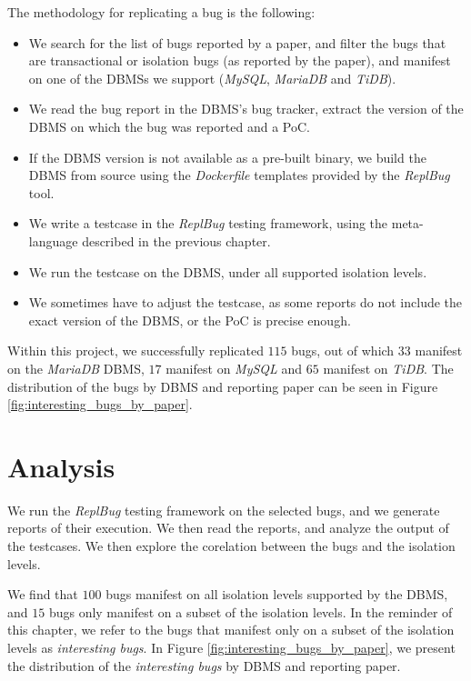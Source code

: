 The methodology for replicating a bug is the following:
\begin{itemize}
    \item We search for the list of bugs reported by a paper, and filter the bugs that are transactional or isolation bugs (as reported by the paper), and manifest on one of the DBMSs we support (\textit{MySQL}, \textit{MariaDB} and \textit{TiDB}).
    \item We read the bug report in the DBMS's bug tracker, extract the version of the DBMS on which the bug was reported and a PoC.
    \item If the DBMS version is not available as a pre-built binary, we build the DBMS from source using the \textit{Dockerfile} templates provided by the \textit{ReplBug} tool.
    \item We write a testcase in the \textit{ReplBug} testing framework, using the meta-language described in the previous chapter.
    \item We run the testcase on the DBMS, under all supported isolation levels.
    \item We sometimes have to adjust the testcase, as some reports do not include the exact version of the DBMS, or the PoC is precise enough. 
\end{itemize}

Within this project, we successfully replicated $115$ bugs, out of which $33$ manifest on the \textit{MariaDB} DBMS, $17$ manifest on \textit{MySQL} and $65$ manifest on \textit{TiDB}. The distribution of the bugs by DBMS and reporting paper can be seen in Figure \ref{fig:interesting_bugs_by_paper}.

\section{Analysis}

We run the \textit{ReplBug} testing framework on the selected bugs, and we generate reports of their execution. We then read the reports, and analyze the output of the testcases. We then explore the corelation between the bugs and the isolation levels.

We find that $100$ bugs manifest on all isolation levels supported by the DBMS, and $15$ bugs only manifest on a subset of the isolation levels. In the reminder of this chapter, we refer to the bugs that manifest only on a subset of the isolation levels as \textit{interesting bugs}. In Figure \ref{fig:interesting_bugs_by_paper}, we present the distribution of the \textit{interesting bugs} by DBMS and reporting paper.

